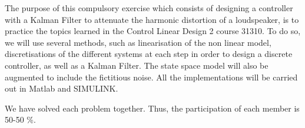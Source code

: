 The purpose of this compulsory exercise which consists of designing a controller with a Kalman Filter to attenuate the harmonic distortion of a loudspeaker, is to practice the topics learned in the Control Linear Design 2 course 31310. To do so, we will use several methods, such as linearisation of the non linear model, discretisations of the different systems at each step in order to design a discrete controller, as well as a Kalman Filter. The state space model will also be augmented to include the fictitious noise. All the implementations will be carried out in Matlab and SIMULINK.

We have solved each problem together. Thus, the participation of each member is 50-50 \%.
